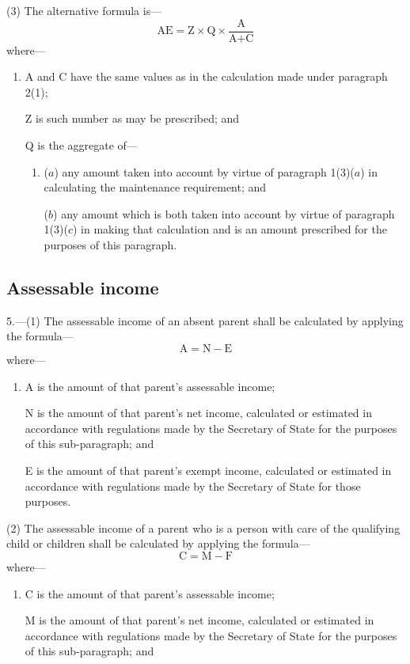 \documentclass[12pt,a4paper]{article}
\begin{document}
{(3) The alternative formula is---
\[
\textrm{AE} = \textrm{Z} \times \textrm{Q} \times \frac{\textrm{A}}{\textrm{A} + \textrm{C}}
\]
where---
\begin{enumerate}\item[]
A and C have the same values as in the calculation made under paragraph 2(1);

Z is such number as may be prescribed; and

Q is the aggregate of---
\begin{enumerate}\item[]
($a$) any amount taken into account by virtue of paragraph 1(3)($a$) in calculating the maintenance requirement; and

($b$) any amount which is both taken into account by virtue of paragraph 1(3)($c$) in making that calculation and is an amount prescribed for the purposes of this paragraph.
\end{enumerate}
\end{enumerate}

\subsection*{Assessable income}

5.---(1) The assessable income of an absent parent shall be calculated by applying the formula---
\[\textrm{A} = \textrm{N} - \textrm{E}\]
where---
\begin{enumerate}\item[]
A is the amount of that parent’s assessable income;

N is the amount of that parent’s net income, calculated or estimated in accordance with regulations made by the Secretary of State for the purposes of this sub-paragraph; and

E is the amount of that parent’s exempt income, calculated or estimated in accordance with regulations made by the Secretary of State for those purposes.
\end{enumerate}


(2) The assessable income of a parent who is a person with care of the qualifying child or children shall be calculated by applying the formula---
\[
\textrm{C} = \textrm{M} - \textrm{F}
\]
where---
\begin{enumerate}\item[]
C is the amount of that parent’s assessable income;

M is the amount of that parent’s net income, calculated or estimated in accordance with regulations made by the Secretary of State for the purposes of this sub-paragraph; and


\end{enumerate}}
\end{document}
